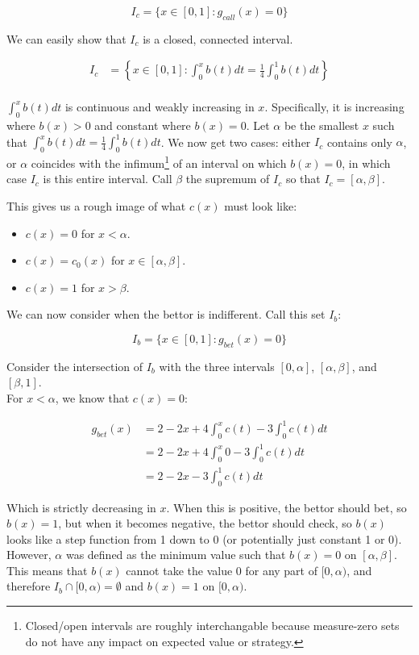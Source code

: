 \documentclass[a4paper,12pt]{article}
\begin{document}
\[ I_c = \{ x \in [0, 1] : g_{call}(x) = 0 \} \]

We can easily show that $I_c$ is a closed, connected interval.

\begin{align*}
    I_c &= \left\{ x \in [0, 1] : \int_{0}^{x} b(t) dt = \frac{1}{4} \int_{0}^{1} b(t)dt \right\} \\
\end{align*}

$\int_{0}^{x} b(t) dt$ is continuous and weakly increasing in $x$. Specifically, it is increasing where $b(x) > 0$ and constant where $b(x) = 0$. Let $\alpha$ be the smallest $x$ such that $\int_{0}^{x} b(t) dt = \frac{1}{4} \int_{0}^{1} b(t)dt$. We now get two cases: either $I_c$ contains only $\alpha$, or $\alpha$ coincides with the infimum\footnote{Closed/open intervals are roughly interchangable because measure-zero sets do not have any impact on expected value or strategy.} of an interval on which $b(x)=0$, in which case $I_c$ is this entire interval. Call $\beta$ the supremum of $I_c$ so that $I_c = [\alpha, \beta]$.

This gives us a rough image of what $c(x)$ must look like: 

\begin{itemize}
    \item $c(x) = 0$ for $x < \alpha$.
    \item $c(x) = c_0(x)$ for $x \in [\alpha, \beta]$.
    \item $c(x) = 1$ for $x > \beta$.
\end{itemize}

We can now consider when the bettor is indifferent. Call this set $I_b$:

\[ I_b = \{ x \in [0, 1] : g_{bet}(x) = 0 \} \]

Consider the intersection of $I_b$ with the three intervals $[0, \alpha]$, $[\alpha, \beta]$, and $[\beta, 1]$.\\

For $x < \alpha$, we know that $c(x) = 0$:

\begin{align*}
    g_{bet}(x) &= 2 - 2x + 4 \int_{0}^{x} c(t) - 3 \int_{0}^{1} c(t) dt \\
    &= 2 - 2x + 4 \int_{0}^{x} 0 - 3 \int_{0}^{1} c(t) dt \\
    &= 2 - 2x - 3 \int_{0}^{1} c(t) dt
\end{align*}

Which is strictly decreasing in $x$. When this is positive, the bettor should bet, so $b(x)=1$, but when it becomes negative, the bettor should check, so $b(x)$ looks like a step function from 1 down to 0 (or potentially just constant 1 or 0). However, $\alpha$ was defined as the minimum value such that $b(x)=0$ on $[\alpha, \beta]$. This means that $b(x)$ cannot take the value 0 for any part of $[0, \alpha)$, and therefore $I_b \cap [0, \alpha) = \emptyset$ and $b(x) = 1$ on $[0, \alpha)$.\\ 
\end{document}
